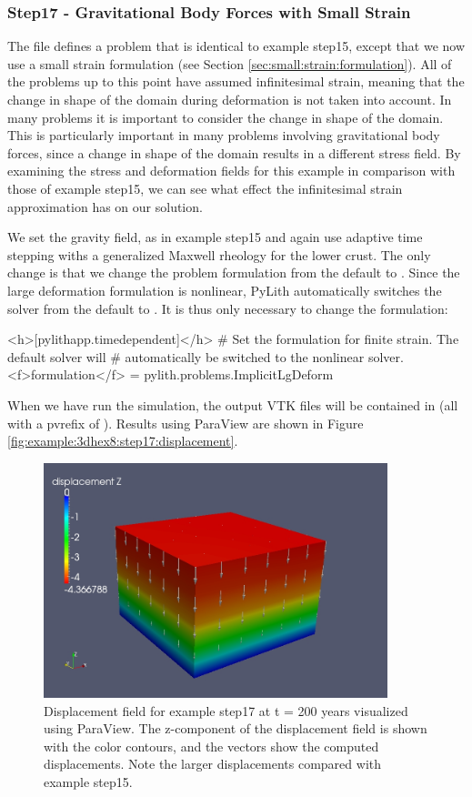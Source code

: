 \subsubsection{Step17 - Gravitational Body Forces with Small Strain}

The  file defines a problem that is identical to
example step15, except that we now use a small strain formulation
(see Section \vref{sec:small:strain:formulation}). All of the problems
up to this point have assumed infinitesimal strain, meaning that the
change in shape of the domain during deformation is not taken into
account. In many problems it is important to consider the change in
shape of the domain. This is particularly important in many problems
involving gravitational body forces, since a change in shape of the
domain results in a different stress field. By examining the stress
and deformation fields for this example in comparison with those of
example step15, we can see what effect the infinitesimal strain approximation
has on our solution.

We set the gravity field, as in example step15 and again use adaptive
time stepping withs a generalized Maxwell rheology for the lower crust.
The only change is that we change the problem formulation from the
default  to . Since the
large deformation formulation is nonlinear, PyLith automatically switches
the solver from the default  to .
It is thus only necessary to change the formulation:
\begin{cfg}
<h>[pylithapp.timedependent]</h>
# Set the formulation for finite strain. The default solver will
# automatically be switched to the nonlinear solver.
<f>formulation</f> = pylith.problems.ImplicitLgDeform
\end{cfg}
When we have run the simulation, the output VTK files will be contained
in  (all with a pvrefix of ).
Results using ParaView are shown in Figure \vref{fig:example:3dhex8:step17:displacement}.

\begin{figure}
  \includegraphics[width=10cm]{examples/figs/3dhex8_step17-displ-t200}
  \caption{Displacement field for example step17 at t = 200 years visualized
    using ParaView. The z-component of the displacement field is shown
    with the color contours, and the vectors show the computed displacements.
    Note the larger displacements compared with example step15.}
  \label{fig:example:3dhex8:step17:displacement}
\end{figure}

